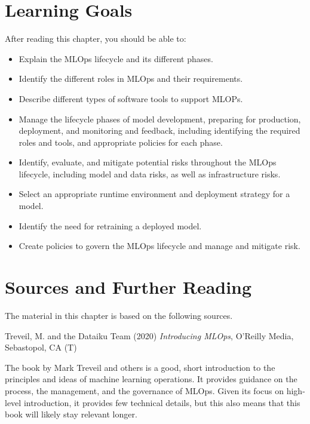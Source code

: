 %
%
\section*{Learning Goals}

After reading this chapter, you should be able to:
\begin{itemize}
    \item Explain the MLOps lifecycle and its different phases. 
    \item Identify the different roles in MLOps and their requirements.
    \item Describe different types of software tools to support MLOPs.
    \item Manage the lifecycle phases of model development, preparing for production, deployment, and monitoring and feedback, including identifying the required roles and tools, and appropriate policies for each phase.
    \item Identify, evaluate, and mitigate potential risks throughout the MLOps lifecycle, including model and data risks, as well as infrastructure risks.
    \item Select an appropriate runtime environment and deployment strategy for a model.
    \item Identify the need for retraining a deployed model.
    \item Create policies to govern the MLOps lifecycle and manage and mitigate risk.
\end{itemize}

\section*{Sources and Further Reading}

The material in this chapter is based on the following sources. 

\begin{tcolorbox}[colback=alert]
Treveil, M. and the Dataiku Team (2020) \emph{Introducing MLOps}, O'Reilly Media, Sebastopol, CA (T) 
\end{tcolorbox}

The book by Mark Treveil and others is a good, short introduction to the principles and ideas of machine learning operations. It provides guidance on the process, the management, and the governance of MLOps. Given its focus on high-level introduction, it provides few technical details, but this also means that this book will likely stay relevant longer. 



